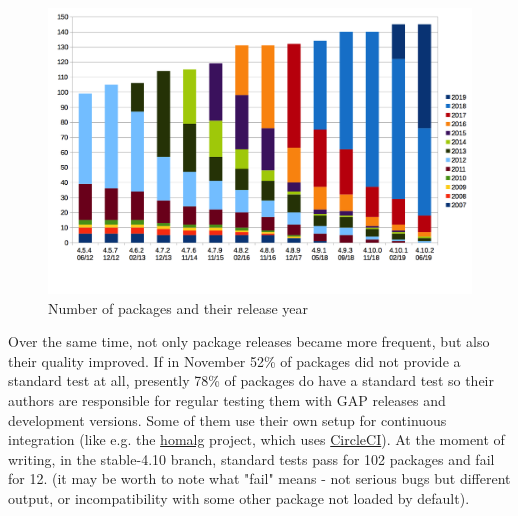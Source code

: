 \begin{figure}[!ht]
    \centering
    \includegraphics[width=\textwidth]{images/gap-package-releases}
    \caption{Number of \GAP packages and their release year}
    \label{fig:gap-package-releases}
\end{figure}


Over the same time, not only package releases became more frequent, but also their quality
improved. If in November 52\% of packages did not provide a standard 
test at all, presently 78\% of packages do have a standard test 
so their authors are responsible for regular testing them 
with GAP releases and development versions.
Some of them use their own setup for continuous integration
(like e.g. the \href{https://homalg-project.github.io/}{\sf homalg} project,
which uses \href{https://circleci.com/}{CircleCI}).
At the moment of writing, in the stable-4.10 branch,
standard tests pass for 102 packages
and fail for 12.
(it may be worth to note what "fail" means - not serious bugs
but different output, or incompatibility with some other package
not loaded by default).

